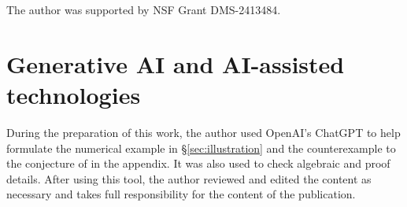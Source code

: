\documentclass[11pt]{article}
\newcommand{\1}{\mathbbm{1}}
\theoremstyle{plain}
\theoremstyle{definition}
\begin{document}
\medskip

\noindent The author was supported by NSF Grant DMS-2413484.



\section*{Generative AI and AI-assisted technologies}

During the preparation of this work, the author used OpenAI's ChatGPT to help formulate the numerical example in \S \ref{sec:illustration} and the counterexample to the conjecture of \citet[\S 9.1]{coh22} in the appendix. It was also used to check algebraic and proof details. After using this tool, the author reviewed and edited the content as necessary and takes full responsibility for the content of the publication.

\appendix
\end{document}
